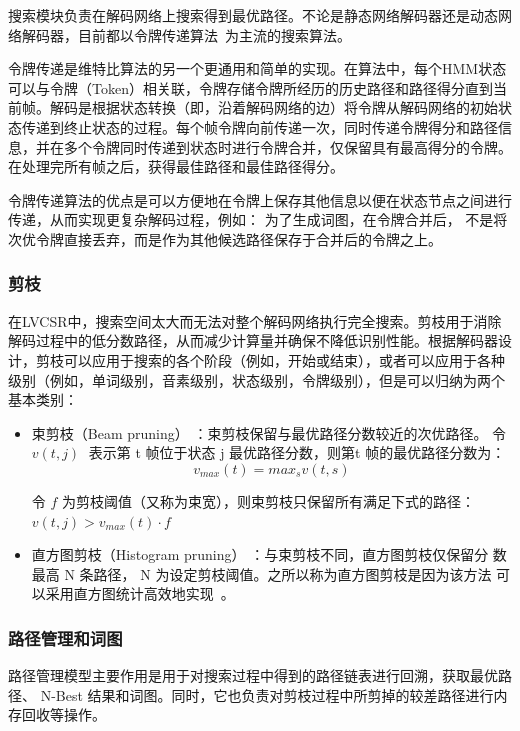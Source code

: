 搜索模块负责在解码网络上搜索得到最优路径。不论是静态网络解码器还是动态网络解码器，目前都以令牌传递算法~\cite{young1989token}为主流的搜索算法。

令牌传递是维特比算法的另一个更通用和简单的实现。在算法中，每个HMM状态可以与令牌（Token）相关联，令牌存储令牌所经历的历史路径和路径得分直到当前帧。解码是根据状态转换（即，沿着解码网络的边）将令牌从解码网络的初始状态传递到终止状态的过程。每个帧令牌向前传递一次，同时传递令牌得分和路径信息，并在多个令牌同时传递到状态时进行令牌合并，仅保留具有最高得分的令牌。在处理完所有帧之后，获得最佳路径和最佳路径得分。

令牌传递算法的优点是可以方便地在令牌上保存其他信息以便在状态节点之间进行传递，从而实现更复杂解码过程，例如： 为了生成词图，在令牌合并后， 不是将次优令牌直接丢弃，而是作为其他候选路径保存于合并后的令牌之上。

\subsubsection{剪枝}

在LVCSR中，搜索空间太大而无法对整个解码网络执行完全搜索。剪枝用于消除解码过程中的低分数路径，从而减少计算量并确保不降低识别性能。根据解码器设计，剪枝可以应用于搜索的各个阶段（例如，开始或结束），或者可以应用于各种级别（例如，单词级别，音素级别，状态级别，令牌级别），但是可以归纳为两个基本类别：

\begin{itemize}
\item 束剪枝（Beam pruning） ：束剪枝保留与最优路径分数较近的次优路径。
令 $v(t,j)$ 表示第 t 帧位于状态 j 最优路径分数，则第t 帧的最优路径分数为：
\begin{equation}
v_{max}(t)=max_s v(t,s)
\end{equation}

令 $f$ 为剪枝阈值（又称为束宽），则束剪枝只保留所有满足下式的路径：
$v(t,j)>v_{max}(t)\cdot f$
\item 直方图剪枝（Histogram pruning） ：与束剪枝不同，直方图剪枝仅保留分
数最高 N 条路径， N 为设定剪枝阈值。之所以称为直方图剪枝是因为该方法
可以采用直方图统计高效地实现~\cite{pylkkonen2005new}。
\end{itemize}

\subsubsection{路径管理和词图}

路径管理模型主要作用是用于对搜索过程中得到的路径链表进行回溯，获取最优路径、
N-Best 结果和词图。同时，它也负责对剪枝过程中所剪掉的较差路径进行内存回收等操作。

